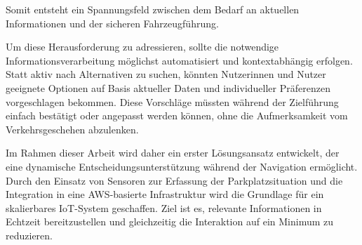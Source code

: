 Somit entsteht ein Spannungsfeld zwischen dem Bedarf an aktuellen Informationen und der sicheren Fahrzeugführung. 

Um diese Herausforderung zu adressieren, sollte die notwendige Informationsverarbeitung möglichst automatisiert und kontextabhängig erfolgen. 
Statt aktiv nach Alternativen zu suchen, könnten Nutzerinnen und Nutzer geeignete Optionen auf Basis aktueller Daten und individueller Präferenzen vorgeschlagen bekommen. 
Diese Vorschläge müssten während der Zielführung einfach bestätigt oder angepasst werden können, ohne die Aufmerksamkeit vom Verkehrsgeschehen abzulenken. 

Im Rahmen dieser Arbeit wird daher ein erster Lösungsansatz entwickelt, der eine dynamische Entscheidungsunterstützung während der Navigation ermöglicht. 
Durch den Einsatz von Sensoren zur Erfassung der Parkplatzsituation und die Integration in eine \ac{AWS}-basierte Infrastruktur wird die Grundlage für ein skalierbares \ac{IoT}-System geschaffen. 
Ziel ist es, relevante Informationen in Echtzeit bereitzustellen und gleichzeitig die Interaktion auf ein Minimum zu reduzieren.